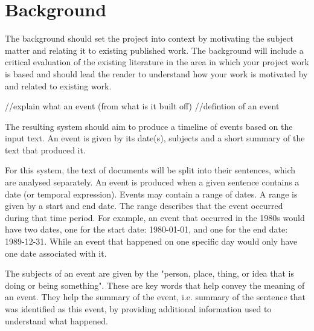 \chapter{Background}
\par The background should set the project into context by motivating the subject matter and relating it to existing published work. The background will include a critical evaluation of the existing literature in the area in which your project work is based and should lead the reader to understand how your work is motivated by and related to existing work.

//explain what an event (from what is it built off) //defintion of an event
\par The resulting system should aim to produce a timeline of events based on the input text. An event is given by its date(s), subjects and a short summary of the text that produced it. 
\par For this system, the text of documents will be split into their sentences, which are analysed separately. An event is produced when a given sentence contains a date (or temporal expression). Events may contain a range of dates. A range is given by a start and end date. The range describes that the event occurred during that time period. For example, an event that occurred in the 1980s would have two dates, one for the start date: 1980-01-01, and one for the end date: 1989-12-31. While an event that happened on one specific day would only have one date associated with it. 
\par The subjects of an event are given by the "person, place, thing, or idea that is doing or being something"\cite{grammar}. These are key words that help convey the meaning of an event. They help the summary of the event, i.e. summary of the sentence that was identified as this event, by providing additional information used to understand what happened.


